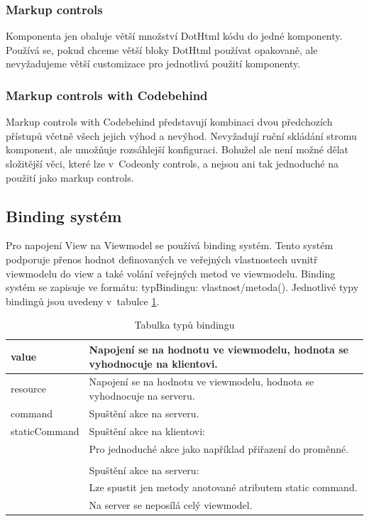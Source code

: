 \subsubsection{Markup controls}
 Komponenta jen obaluje větší množství DotHtml kódu do jedné komponenty. Používá se, pokud chceme větší bloky DotHtml používat opakovaně, ale nevyžadujeme větší customizace pro jednotlivá použití komponenty.
 
 \subsubsection{Markup controls with Codebehind}
 Markup controls with Codebehind představují kombinaci dvou předchozích přístupů včetně všech jejich výhod a nevýhod. Nevyžadují ruční skládání stromu komponent, ale umožňuje rozsáhlejší konfiguraci. Bohužel ale není možné dělat složitější věci, které lze v~Codeonly controls, a nejsou ani tak jednoduché na použití jako markup controls.
 
\subsection*{Binding systém}
\label{DotVVMBinding}
Pro napojení View na Viewmodel se používá binding systém. Tento systém podporuje přenos hodnot definovaných ve veřejných vlastnostech uvnitř viewmodelu do view a také volání veřejných metod ve viewmodelu.
Binding systém se zapisuje ve formátu: {typBindingu: vlastnost/metoda()}\cite{DotVVM-Binding}. Jednotlivé typy bindingů jsou uvedeny v~tabulce \ref{tab: Tabulka typů bindingu}.

\begin{table}[H]
	\caption{Tabulka typů bindingu} 
	\centering
	\begin{tabular}{m{8em}|m{30em}}
		\toprule
		value & Napojení se na hodnotu ve viewmodelu, hodnota se vyhodnocuje na klientovi.\\ \midrule
		resource & Napojení se na hodnotu ve viewmodelu, hodnota se vyhodnocuje na serveru.\\ \midrule
		command & Spuštění akce na serveru.\\ \midrule
		staticCommand & Spuštění akce na klientovi: \\
		& Pro jednoduché akce jako například přiřazení do proměnné. \\\\
		& Spuštění akce na serveru: \\
		& Lze spustit jen metody anotované atributem static command. \\
		& Na server se neposílá celý viewmodel. \\

		\bottomrule
	\end{tabular}
	\label{tab: Tabulka typů bindingu}
\end{table}

